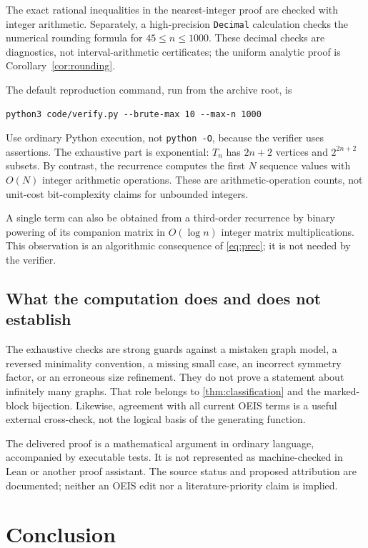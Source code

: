 \documentclass[11pt,letterpaper]{article}
\numberwithin{equation}{section}
\theoremstyle{definition}
\theoremstyle{remark}
\begin{document}
The exact rational inequalities in the nearest-integer proof are
checked with integer arithmetic. Separately, a high-precision
\texttt{Decimal} calculation checks the numerical rounding formula
for $45\le n\le1000$. These decimal checks are diagnostics, not
interval-arithmetic certificates; the uniform analytic proof is
Corollary~\ref{cor:rounding}.

The default reproduction command, run from the archive root, is
\begin{verbatim}
python3 code/verify.py --brute-max 10 --max-n 1000
\end{verbatim}
Use ordinary Python execution, not \texttt{python -O}, because the
verifier uses assertions. The exhaustive part is exponential:
$T_n$ has $2n+2$ vertices and $2^{2n+2}$ subsets. By contrast, the
recurrence computes the first $N$ sequence values with $O(N)$
integer arithmetic operations. These are arithmetic-operation
counts, not unit-cost bit-complexity claims for unbounded integers.

A single term can also be obtained from a third-order recurrence
by binary powering of its companion matrix in $O(\log n)$ integer
matrix multiplications. This observation is an algorithmic
consequence of \eqref{eq:prec}; it is not needed by the verifier.

\subsection{What the computation does and does not establish}
The exhaustive checks are strong guards against a mistaken graph
model, a reversed minimality convention, a missing small case, an
incorrect symmetry factor, or an erroneous size refinement. They
do not prove a statement about infinitely many graphs. That role
belongs to \cref{thm:classification} and the marked-block bijection.
Likewise, agreement with all current OEIS terms is a useful external
cross-check, not the logical basis of the generating function.

The delivered proof is a mathematical argument in ordinary
language, accompanied by executable tests. It is not represented
as machine-checked in Lean or another proof assistant. The source
status and proposed attribution are documented; neither an OEIS
edit nor a literature-priority claim is implied.

\section{Conclusion}
\end{document}
